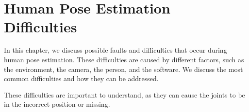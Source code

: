\chapter{Human Pose Estimation Difficulties}
\label{sec:errors}

In this chapter, we discuss possible faults and difficulties that occur during human pose estimation. These difficulties are caused by different factors, such as the environment, the camera, the person, and the software. We discuss the most common difficulties and how they can be addressed. 

These difficulties are important to understand, as they can cause the joints to be in the incorrect position or missing. 



